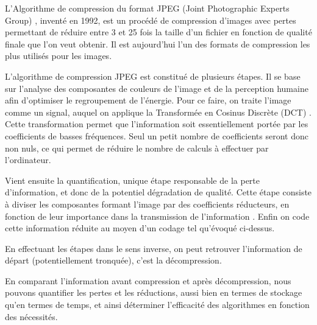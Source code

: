 \documentclass{article}
\begin{document}
L'Algorithme de compression du format JPEG (Joint Photographic Experts Group) \cite{jpeg}, inventé en 1992, est un procédé de compression d'images avec pertes permettant de réduire entre 3 et 25 fois la taille d'un fichier en fonction de qualité finale que l'on veut obtenir. Il est aujourd'hui l'un des formats de compression les plus utilisés pour les images.

L'algorithme de compression JPEG est constitué de plusieurs étapes. Il se base sur l'analyse des composantes de couleurs de l'image et de la perception humaine afin d'optimiser le regroupement de l'énergie. Pour ce faire, on traite l'image comme un signal, auquel on applique la Transformée en Cosinus Discrète (DCT) \cite{jpeg}. Cette transformation permet que l'information soit essentiellement portée par les coefficients de basses fréquences. Seul un petit nombre de coefficients seront donc non nuls, ce qui permet de réduire le nombre de calculs à effectuer par l'ordinateur.

Vient ensuite la quantification, unique étape responsable de la perte d'information, et donc de la potentiel dégradation de qualité. Cette étape consiste à diviser les composantes formant l'image par des coefficients réducteurs, en fonction de leur importance dans la transmission de l'information \cite{code-theory} \cite{jpeg}. Enfin on code cette information \og réduite \fg au moyen d'un codage tel qu'évoqué ci-dessus.

En effectuant les étapes dans le sens inverse, on peut retrouver l'information de départ (potentiellement tronquée), c'est la décompression.

En comparant l'information avant compression et après décompression, nous pouvons quantifier les pertes et les réductions, aussi bien en termes de stockage qu'en termes de temps, et ainsi déterminer l'efficacité des algorithmes en fonction des nécessités.

\printbibliography
\end{document}
